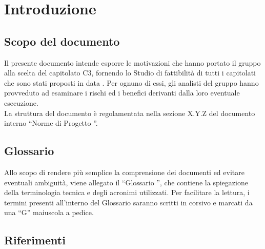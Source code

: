 \section{Introduzione}
	\subsection{Scopo del documento}
		Il presente documento intende esporre le motivazioni che hanno portato il gruppo alla scelta del capitolato C3, fornendo lo Studio di fattibilità di tutti i capitolati che sono stati proposti in data . Per ognuno di essi, gli analisti del gruppo hanno provveduto ad esaminare i rischi ed i benefici derivanti dalla loro eventuale esecuzione.\\
		La struttura del documento è regolamentata nella sezione X.Y.Z del documento interno ``Norme di Progetto \lastversion''.
	\subsection{Glossario}
		Allo scopo di rendere più semplice la comprensione dei documenti ed evitare eventuali ambiguità, viene allegato il %
		``Glossario \lastversion'', che contiene la spiegazione della terminologia tecnica e degli acronimi utilizzati. Per facilitare la lettura, i termini presenti all'interno del Glossario saranno scritti in corsivo e marcati da una ``G'' maiuscola a pedice.
	\subsection{Riferimenti}

